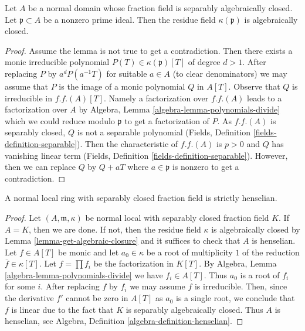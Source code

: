 \begin{lemma}
\label{lemma-get-algebraic-closure}
Let $A$ be a normal domain whose fraction field is separably algebraically
closed. Let $\mathfrak p \subset A$ be a nonzero prime ideal.
Then the residue field $\kappa(\mathfrak p)$ is algebraically closed.
\end{lemma}

\begin{proof}
Assume the lemma is not true to get a contradiction. Then there exists a
monic irreducible polynomial $P(T) \in \kappa(\mathfrak p)[T]$ of
degree $d > 1$. After replacing $P$ by $a^d P(a^{-1}T)$ for suitable $a \in A$
(to clear denominators) we may assume that $P$ is the image of a
monic polynomial $Q$ in $A[T]$. Observe that $Q$ is irreducible in
$f.f.(A)[T]$. Namely a factorization over $f.f.(A)$ leads to a factorization
over $A$ by Algebra, Lemma \ref{algebra-lemma-polynomials-divide}
which we could reduce modulo $\mathfrak p$ to get a factorization of $P$.
As $f.f.(A)$ is separably closed, $Q$ is not a separable polynomial
(Fields, Definition \ref{fields-definition-separable}).
Then the characteristic of $f.f.(A)$ is $p > 0$ and $Q$ has
vanishing linear term (Fields, Definition \ref{fields-definition-separable}).
However, then we can replace $Q$ by
$Q + a T$ where $a \in \mathfrak p$ is nonzero to get a contradiction.
\end{proof}

\begin{lemma}
\label{lemma-normal-local-domain-separablly-closed-fraction-field}
A normal local ring with separably closed fraction field is
strictly henselian.
\end{lemma}

\begin{proof}
Let $(A, \mathfrak m, \kappa)$ be normal local with separably
closed fraction field $K$. If $A = K$, then we are done. If not,
then the residue field $\kappa$ is algebraically closed
by Lemma \ref{lemma-get-algebraic-closure} and it suffices to
check that $A$ is henselian.
Let $f \in A[T]$ be monic and let $a_0 \in \kappa$ be a root
of multiplicity $1$ of the reduction $\overline{f} \in \kappa[T]$.
Let $f = \prod f_i$ be the factorization in $K[T]$.
By Algebra, Lemma \ref{algebra-lemma-polynomials-divide} we have
$f_i \in A[T]$. Thus $a_0$ is a root of $f_i$ for some $i$.
After replacing $f$ by $f_i$ we may assume $f$ is irreducible.
Then, since the derivative $f'$ cannot be zero in $A[T]$
as $a_0$ is a single root, we conclude that $f$ is linear
due to the fact that $K$ is separably algebraically closed.
Thus $A$ is henselian, see
Algebra, Definition \ref{algebra-definition-henselian}.
\end{proof}

